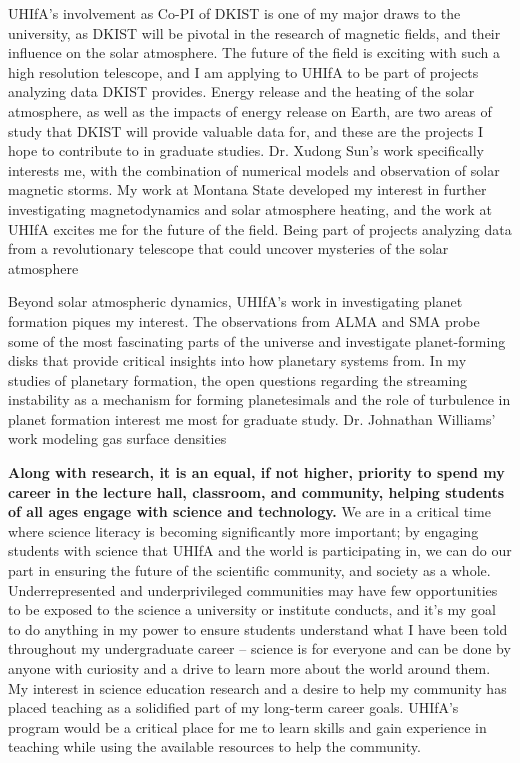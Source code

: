 \documentclass[11pt,letterpaper]{article}
\begin{document}
UHIfA's involvement as Co-PI of DKIST is one of my major draws to the university, as DKIST will be pivotal in the research of magnetic fields, and their influence on the solar atmosphere. The future of the field is exciting with such a high resolution telescope, and I am applying to UHIfA to be part of projects analyzing data DKIST provides. Energy release and the heating of the solar atmosphere, as well as the impacts of energy release on Earth, are two areas of study that DKIST will provide valuable data for, and these are the projects I hope to contribute to in graduate studies. Dr. Xudong Sun's work specifically interests me, with the combination of numerical models and observation of solar magnetic storms. My work at Montana State developed my interest in further investigating magnetodynamics and solar atmosphere heating, and the work at UHIfA excites me for the future of the field. Being part of projects analyzing data from a revolutionary telescope that could uncover mysteries of the solar atmosphere 

Beyond solar atmospheric dynamics, UHIfA's work in investigating planet formation piques my interest. The observations from ALMA and SMA probe some of the most fascinating parts of the universe and investigate planet-forming disks that provide critical insights into how planetary systems from. In my studies of planetary formation, the open questions regarding the streaming instability as a mechanism for forming planetesimals and the role of turbulence in planet formation interest me most for graduate study. Dr. Johnathan Williams' work modeling gas surface densities 

\textbf{Along with research, it is an equal, if not higher, priority to spend my career in the lecture hall, classroom, and community, helping students of all ages engage with science and technology.} We are in a critical time where science literacy is becoming significantly more important; by engaging students with science that UHIfA and the world is participating in, we can do our part in ensuring the future of the scientific community, and society as a whole. Underrepresented and underprivileged communities may have few opportunities to be exposed to the science a university or institute conducts, and it’s my goal to do anything in my power to ensure students understand what I have been told throughout my undergraduate career -- science is for everyone and can be done by anyone with curiosity and a drive to learn more about the world around them. My interest in science education research and a desire to help my community has placed teaching as a solidified part of my long-term career goals. UHIfA’s program would be a critical place for me to learn skills and gain experience in teaching while using the available resources to help the community.
\end{document}
